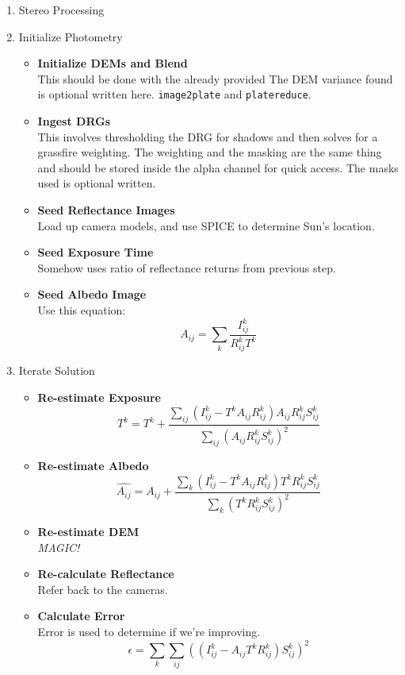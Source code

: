 \begin{enumerate}
\item Stereo Processing
\item Initialize Photometry
  \begin{itemize}
    \item \textbf{Initialize DEMs and Blend} \hfill \\
      This should be done with the already provided The DEM variance found is optional written here.
      \texttt{image2plate} and \texttt{platereduce}.
    \item \textbf{Ingest DRGs} \hfill \\
      This involves thresholding the DRG for shadows and then solves
      for a grassfire weighting. The weighting and the masking are the
      same thing and should be stored inside the alpha channel for
      quick access. The masks used is optional written.
    \item \textbf{Seed Reflectance Images} \hfill \\
      Load up camera models, and use SPICE to determine Sun's
      location.
    \item \textbf{Seed Exposure Time} \hfill \\
      Somehow uses ratio of reflectance returns from previous step.
    \item \textbf{Seed Albedo Image} \hfill \\
      Use this equation:
      \[
      A_{ij}=\sum_{k}\frac{I^{k}_{ij}}{R^{k}_{ij}T^{k}}
      \]
  \end{itemize}
\item Iterate Solution
  \begin{itemize}
    \item \textbf{Re-estimate Exposure} \hfill \\
      \[
      \hat{T^{k}} = T^{k}+\frac{\sum_{ij}(I^{k}_{ij}-T^{k}A_{ij}R^{k}_{ij})A_{ij}R^{k}_{ij}S^{k}_{ij}}{\sum_{ij}(A_{ij}R^{k}_{ij}S^k_{ij})^{2}}
      \]
    \item \textbf{Re-estimate Albedo} \hfill \\
      \[
      \hat{A_{ij}} = A_{ij}+\frac{\sum_{k}(I^k_{ij}-T^kA_{ij}R^k_{ij})T^kR^k_{ij}S^{k}_{ij}}{\sum_{k}(T^kR^k_{ij}S^k_{ij})^2}
      \]
    \item \textbf{Re-estimate DEM} \hfill \\
      \emph{MAGIC!}
    \item \textbf{Re-calculate Reflectance} \hfill \\
      Refer back to the cameras.
    \item \textbf{Calculate Error} \hfill \\
      Error is used to determine if we're improving.
      \[
      \epsilon=\sum_{k}\sum_{ij}((I^k_{ij}-A_{ij}T^kR^k_{ij})S^k_{ij})^2
      \]
  \end{itemize}
\end{enumerate}

